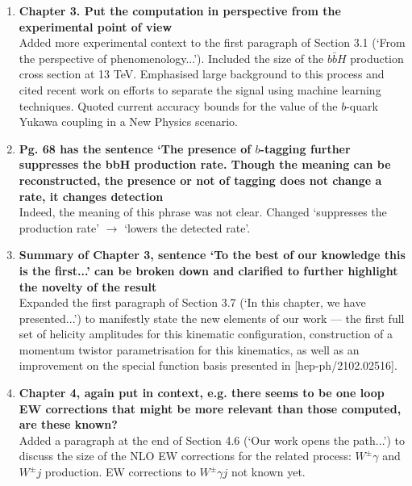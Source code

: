 \documentclass[main.tex]{subfiles}
\begin{document}
\begin{enumerate}
    \item \textbf{Chapter 3. Put the computation in perspective from the experimental point of view} \\
    Added more experimental context to the first paragraph of Section 3.1 (`From the perspective of phenomenology...'). Included the size of the $b\bar{b}H$ production cross section at 13 TeV. Emphasised large background to this process and cited recent work on efforts to separate the signal using machine learning techniques. Quoted current accuracy bounds for the value of the $b$-quark Yukawa coupling in a New Physics scenario. 
    
    \item \textbf{Pg. 68 has the sentence `The presence of $b$-tagging further suppresses the bbH
production rate. Though the meaning can be reconstructed, the presence or not of
tagging does not change a rate, it changes detection} \\
Indeed, the meaning of this phrase was not clear. Changed `suppresses the production rate' $\rightarrow$ `lowers the detected rate'.

    \item \textbf{Summary of Chapter 3, sentence `To the best of our knowledge this is the first...' can be broken down and clarified to further highlight the novelty of the result}
\\
Expanded the first paragraph of Section 3.7 (`In this chapter, we have presented...') to manifestly state the new elements of our work --- the first full set of helicity amplitudes for this kinematic configuration, construction of a momentum twistor parametrisation for this kinematics, as well as an improvement on the special function basis presented in [hep-ph/2102.02516].

    \item \textbf{Chapter 4, again put in context, e.g. there seems to be one loop EW corrections that might be more relevant than those computed, are these known?} \\
Added a paragraph at the end of Section 4.6 (`Our work opens the path...') to discuss the size of the NLO EW corrections for the related process: $W^\pm \gamma$ and $W^\pm j$ production. EW corrections to $W^\pm \gamma j$ not known yet.


\end{enumerate}
\end{document}
